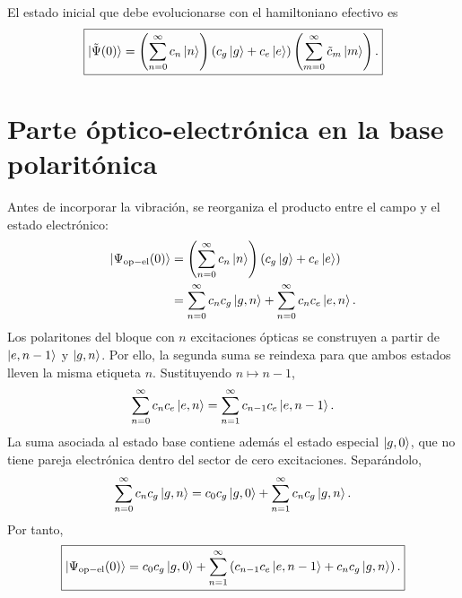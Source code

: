 \documentclass[11pt]{article}
\begin{document}
El estado inicial que debe evolucionarse con el hamiltoniano efectivo es
\begin{equation}
  \boxed{
  \ket{\tilde\Psi(0)}
  =
  \left(\sum_{n=0}^{\infty}c_n\ket n\right)
  \left(c_g\ket g+c_e\ket e\right)
  \left(\sum_{m=0}^{\infty}\tilde c_m\ket m\right).
  }
\end{equation}

\section{Parte \'optico-electr\'onica en la base polarit\'onica}

Antes de incorporar la vibraci\'on, se reorganiza el producto entre el campo y
el estado electr\'onico:
\begin{align}
  \ket{\Psi_{\mathrm{op-el}}(0)}
  &=
  \left(\sum_{n=0}^{\infty}c_n\ket n\right)
  \left(c_g\ket g+c_e\ket e\right)
  \notag\\
  &=
  \sum_{n=0}^{\infty}c_nc_g\ket{g,n}
  +
  \sum_{n=0}^{\infty}c_nc_e\ket{e,n}.
\end{align}
Los polaritones del bloque con $n$ excitaciones \'opticas se construyen a
partir de $\ket{e,n-1}$ y $\ket{g,n}$. Por ello, la segunda suma se reindexa
para que ambos estados lleven la misma etiqueta $n$. Sustituyendo
$n\mapsto n-1$,
\begin{equation}
  \sum_{n=0}^{\infty}c_nc_e\ket{e,n}
  =
  \sum_{n=1}^{\infty}c_{n-1}c_e\ket{e,n-1}.
\end{equation}
La suma asociada al estado base contiene adem\'as el estado especial
$\ket{g,0}$, que no tiene pareja electr\'onica dentro del sector de cero
excitaciones. Separ\'andolo,
\begin{equation}
  \sum_{n=0}^{\infty}c_nc_g\ket{g,n}
  =
  c_0c_g\ket{g,0}
  +
  \sum_{n=1}^{\infty}c_nc_g\ket{g,n}.
\end{equation}
Por tanto,
\begin{equation}
  \boxed{
  \ket{\Psi_{\mathrm{op-el}}(0)}
  =
  c_0c_g\ket{g,0}
  +
  \sum_{n=1}^{\infty}
  \left(
  c_{n-1}c_e\ket{e,n-1}
  +
  c_nc_g\ket{g,n}
  \right).
  }
\end{equation}
\end{document}

